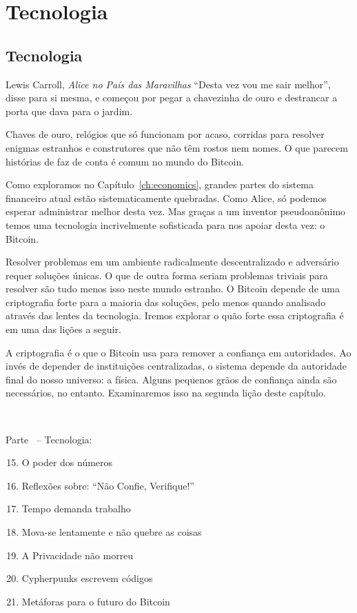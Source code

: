 \part{Tecnologia}
\label{ch:technology}
\chapter*{Tecnologia}

\begin{chapquote}{Lewis Carroll, \textit{Alice no País das Maravilhas}}
\enquote{Desta vez vou me sair melhor}, disse para si mesma, e começou por pegar a chavezinha de ouro e destrancar a porta que dava para o jardim.
\end{chapquote}

Chaves de ouro, relógios que só funcionam por acaso, corridas para resolver enigmas estranhos e construtores que não têm rostos nem nomes. O que parecem histórias de faz de conta é comum no mundo do Bitcoin.

Como exploramos no Capítulo~\ref{ch:economics}, grandes partes do sistema financeiro atual estão sistematicamente quebradas. Como Alice, só podemos esperar administrar melhor desta vez. Mas graças a um inventor pseudoanônimo temos uma tecnologia incrivelmente sofisticada para nos apoiar desta vez: o Bitcoin.

Resolver problemas em um ambiente radicalmente descentralizado e adversário requer soluções únicas. O que de outra forma seriam problemas triviais para resolver são tudo menos isso neste mundo estranho. O Bitcoin depende de uma criptografia forte para a maioria das soluções, pelo menos quando analisado através das lentes da tecnologia. Iremos explorar o quão forte essa criptografia é em uma das lições a seguir.

A criptografia é o que o Bitcoin usa para remover a confiança em autoridades. Ao invés de depender de instituições centralizadas, o sistema depende da autoridade final do nosso universo: a física. Alguns pequenos grãos de confiança ainda são necessários, no entanto. Examinaremos isso na segunda lição deste capítulo.

~

\begin{samepage}
Parte~\ref{ch:technology} -- Tecnologia:

\begin{enumerate}
  \setcounter{enumi}{14}
  \item O poder dos números
  \item Reflexões sobre: \enquote{Não Confie, Verifique!}
  \item Tempo demanda trabalho
  \item Mova-se lentamente e não quebre as coisas
  \item A Privacidade não morreu
  \item Cypherpunks escrevem códigos
  \item Metáforas para o futuro do Bitcoin
\end{enumerate}
\end{samepage}

